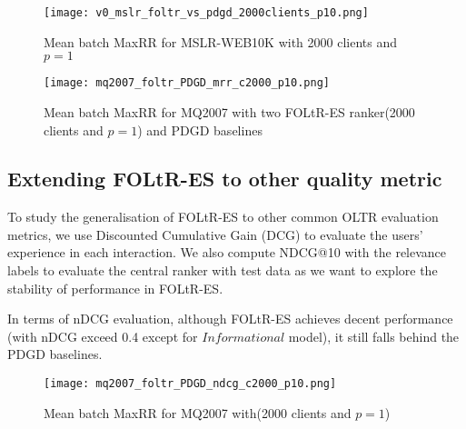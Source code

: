 \begin{figure}[H]
	\centering
	\texttt{[image: v0\_mslr\_foltr\_vs\_pdgd\_2000clients\_p10.png]}
	\caption{Mean batch MaxRR for MSLR-WEB10K with 2000 clients and $p = 1$}
	\label{fig: mslr-v0-baseline}
\end{figure}

\begin{figure}[H]
	\centering
	\texttt{[image: mq2007\_foltr\_PDGD\_mrr\_c2000\_p10.png]}
	\caption{Mean batch MaxRR for MQ2007 with two FOLtR-ES ranker(2000 clients and $p = 1$) and PDGD baselines}
	\label{fig: mq2007-rq3}
\end{figure}


\subsection{Extending FOLtR-ES to other quality metric}


To study the generalisation of FOLtR-ES to other common OLTR evaluation metrics, we use Discounted Cumulative Gain (DCG) to evaluate the users' experience in each interaction. We also compute NDCG@10 with the relevance labels to evaluate the central ranker with test data as we want to explore the stability of  performance in FOLtR-ES.

In terms of nDCG evaluation, although FOLtR-ES achieves decent performance (with nDCG exceed 0.4 except for $Informational$ model), it still falls behind the PDGD baselines.

\begin{figure}[H]
	\centering
	\texttt{[image: mq2007\_foltr\_PDGD\_ndcg\_c2000\_p10.png]}
	\caption{Mean batch MaxRR for MQ2007 with(2000 clients and $p = 1$)}
	\label{fig: mq2007-rq4}
\end{figure}